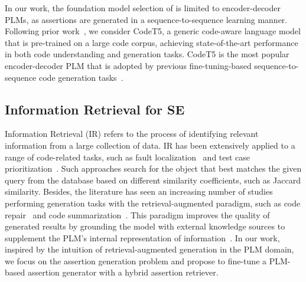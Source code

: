In our work, the foundation model selection of \toolname{} is limited to encoder-decoder PLMs, as assertions are generated in a sequence-to-sequence learning manner.
Following prior work~\cite{wang2023rap,fu2022vulrepair,zhang2023pre,zhou2024out}, we consider CodeT5, a generic code-aware language model that is pre-trained on a large code corpus, achieving state-of-the-art performance in both code understanding and generation tasks.
CodeT5 is the most popular encoder-decoder PLM that is adopted by previous fine-tuning-based sequence-to-sequence code generation tasks~\cite{wang2024software,yuan2022circle,zhu2024grammart5}.



\subsection{Information Retrieval for SE}
\label{sec:background_IR}

Information Retrieval (IR) refers to the process of identifying relevant information from a large collection of data.
IR has been extensively applied to a range of code-related tasks, such as fault localization~\cite{dao2017does} and test case prioritization~\cite{peng2020empirically}.
Such approaches search for the object that best matches the given query from the database based on different similarity coefficients, such as Jaccard similarity.
Besides, the literature has seen an increasing number of studies performing generation tasks with the retrieval-augmented paradigm, such as code repair~\cite{wang2023rap,nashid2023retrieval} and code summarization~\cite{li2021editsum,parvez2021retrieval}.
This paradigm improves the quality of generated results by grounding the model with external knowledge sources to supplement the PLM's internal representation of information~\cite{lewis2020retrieval}.
In our work, inspired by the intuition of retrieval-augmented generation in the PLM domain, we focus on the assertion generation problem and propose \toolname{} to fine-tune a PLM-based assertion generator with a hybrid assertion retriever.
